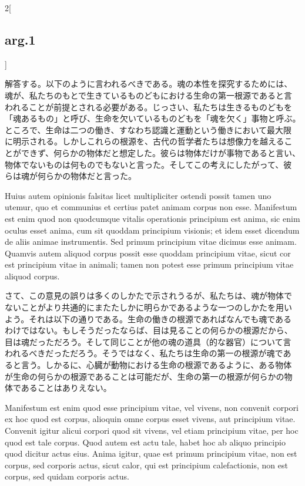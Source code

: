 \documentclass[paper=a4paper,fontsize=10pt,jafontsize=9pt,titlepage]{jlreq}
\begin{document}
\begin{paracol}{2}[\subsection{arg.1}]
\switchcolumn

解答する。以下のように言われるべきである。魂の本性を探究するためには、
魂が、私たちのもとで生きているものどもにおける生命の第一根源であると言
われることが前提とされる必要がある。じっさい、私たちは生きるものどもを
「魂あるもの」と呼び、生命を欠いているものどもを「魂を欠く」事物と呼ぶ。
ところで、生命は二つの働き、すなわち認識と運動という働きにおいて最大限
に明示される。しかしこれらの根源を、古代の哲学者たちは想像力を越えるこ
とができず、何らかの物体だと想定した。彼らは物体だけが事物であると言い、
物体でないものは何ものでもないと言った。そしてこの考えにしたがって、彼
らは魂が何らかの物体だと言った。

\switchcolumn*



Huius autem opinionis falsitas licet multipliciter ostendi
possit tamen uno utemur, quo et communius et certius patet animam
corpus non esse. Manifestum est enim quod non quodcumque vitalis
operationis principium est anima, sic enim oculus esset anima, cum sit
quoddam principium visionis; et idem esset dicendum de aliis animae
instrumentis. Sed primum principium vitae dicimus esse animam. Quamvis
autem aliquod corpus possit esse quoddam principium vitae, sicut cor
est principium vitae in animali; tamen non potest esse primum
principium vitae aliquod corpus. 


\switchcolumn

さて、この意見の誤りは多くのしかたで示されうるが、私たちは、魂が物体で
ないことがより共通的にまたたしかに明らかであるような一つのしかたを用い
よう。それは以下の通りである。生命の働きの根源であればなんでも魂である
わけではない。もしそうだったならば、目は見ることの何らかの根源だから、
目は魂だっただろう。そして同じことが他の魂の道具（的な器官）について言
われるべきだっただろう。そうではなく、私たちは生命の第一の根源が魂であ
ると言う。しかるに、心臓が動物における生命の根源であるように、ある物体
が生命の何らかの根源であることは可能だが、生命の第一の根源が何らかの物
体であることはありえない。

\switchcolumn*


Manifestum est enim quod esse principium vitae, vel vivens, non convenit corpori
ex hoc quod est corpus, alioquin omne corpus esset vivens, aut principium
vitae. Convenit igitur alicui corpori quod sit vivens, vel etiam principium
vitae, per hoc quod est tale corpus. Quod autem est actu tale, habet hoc ab
aliquo principio quod dicitur actus eius. Anima igitur, quae est primum
principium vitae, non est corpus, sed corporis actus, sicut calor, qui est
principium calefactionis, non est corpus, sed quidam corporis actus.


\end{paracol}
\end{document}
